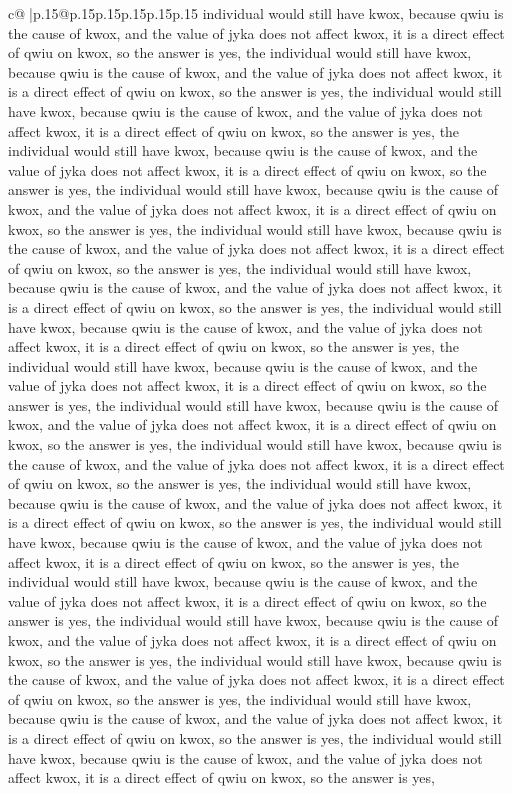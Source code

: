 \documentclass{article}
\begin{document}
{\begin{supertabular}{c@{$\;$}|p{.15\linewidth}@{}p{.15\linewidth}p{.15\linewidth}p{.15\linewidth}p{.15\linewidth}p{.15\linewidth}}
{{{individual would still have kwox, because qwiu is the cause of kwox, and the value of jyka does not affect kwox, it is a direct effect of qwiu on kwox, so the answer is yes, the individual would still have kwox, because qwiu is the cause of kwox, and the value of jyka does not affect kwox, it is a direct effect of qwiu on kwox, so the answer is yes, the individual would still have kwox, because qwiu is the cause of kwox, and the value of jyka does not affect kwox, it is a direct effect of qwiu on kwox, so the answer is yes, the individual would still have kwox, because qwiu is the cause of kwox, and the value of jyka does not affect kwox, it is a direct effect of qwiu on kwox, so the answer is yes, the individual would still have kwox, because qwiu is the cause of kwox, and the value of jyka does not affect kwox, it is a direct effect of qwiu on kwox, so the answer is yes, the individual would still have kwox, because qwiu is the cause of kwox, and the value of jyka does not affect kwox, it is a direct effect of qwiu on kwox, so the answer is yes, the individual would still have kwox, because qwiu is the cause of kwox, and the value of jyka does not affect kwox, it is a direct effect of qwiu on kwox, so the answer is yes, the individual would still have kwox, because qwiu is the cause of kwox, and the value of jyka does not affect kwox, it is a direct effect of qwiu on kwox, so the answer is yes, the individual would still have kwox, because qwiu is the cause of kwox, and the value of jyka does not affect kwox, it is a direct effect of qwiu on kwox, so the answer is yes, the individual would still have kwox, because qwiu is the cause of kwox, and the value of jyka does not affect kwox, it is a direct effect of qwiu on kwox, so the answer is yes, the individual would still have kwox, because qwiu is the cause of kwox, and the value of jyka does not affect kwox, it is a direct effect of qwiu on kwox, so the answer is yes, the individual would still have kwox, because qwiu is the cause of kwox, and the value of jyka does not affect kwox, it is a direct effect of qwiu on kwox, so the answer is yes, the individual would still have kwox, because qwiu is the cause of kwox, and the value of jyka does not affect kwox, it is a direct effect of qwiu on kwox, so the answer is yes, the individual would still have kwox, because qwiu is the cause of kwox, and the value of jyka does not affect kwox, it is a direct effect of qwiu on kwox, so the answer is yes, the individual would still have kwox, because qwiu is the cause of kwox, and the value of jyka does not affect kwox, it is a direct effect of qwiu on kwox, so the answer is yes, the individual would still have kwox, because qwiu is the cause of kwox, and the value of jyka does not affect kwox, it is a direct effect of qwiu on kwox, so the answer is yes, the individual would still have kwox, because qwiu is the cause of kwox, and the value of jyka does not affect kwox, it is a direct effect of qwiu on kwox, so the answer is yes, the individual would still have kwox, because qwiu is the cause of kwox, and the value of jyka does not affect kwox, it is a direct effect of qwiu on kwox, so the answer is yes, }}}
\end{supertabular}}
\end{document}
